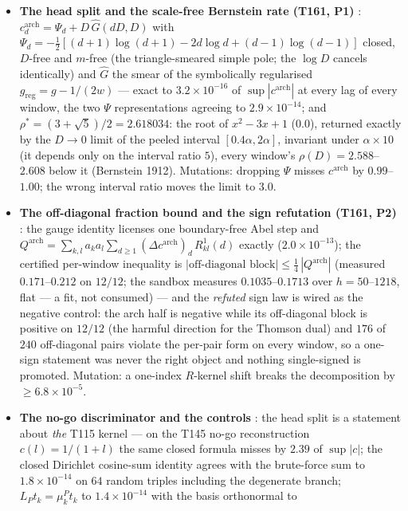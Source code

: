 \documentclass[11pt,a4paper]{article}
\begin{document}
\begin{itemize}[leftmargin=1.5em]
\emph{uniform} fake measure misses by $0.23$--$0.51\ge1.5\times$ the cap --- the agreement
is a property of the von-Mangoldt measure, not of any measure with the same mass.
\item \textbf{The head split and the scale-free Bernstein rate (T161, P1)} \mE:
$c^{\mathrm{arch}}_d=\Psi_d+D\,\widehat G(dD,D)$ with
$\Psi_d=-\tfrac12[(d{+}1)\log(d{+}1)-2d\log d+(d{-}1)\log(d{-}1)]$ closed, $D$-free and
$m$-free (the triangle-smeared simple pole; the $\log D$ cancels identically) and
$\widehat G$ the smear of the symbolically regularised $g_{\mathrm{reg}}=g-1/(2w)$ ---
exact to $3.2\times10^{-16}$ of $\sup|c^{\mathrm{arch}}|$ at every lag of every window, the
two $\Psi$ representations agreeing to $2.9\times10^{-14}$; and
$\rho^*=(3+\sqrt5)/2=2.618034$: the root of $x^2-3x+1$ ($0.0$), returned exactly by the
$D\to0$ limit of the peeled interval $[0.4\alpha,2\alpha]$, invariant under $\alpha\times10$
(it depends only on the interval ratio $5$), every window's $\rho(D)=2.588$--$2.608$ below
it (Bernstein 1912). Mutations: dropping $\Psi$ misses $c^{\mathrm{arch}}$ by
$0.99$--$1.00$; the wrong interval ratio moves the limit to $3.0$.
\item \textbf{The off-diagonal fraction bound and the sign refutation (T161, P2)} \mE: the
gauge identity licenses one boundary-free Abel step and
$Q^{\mathrm{arch}}=\sum_{k,l}a_ka_l\sum_{d\ge1}(\Delta c^{\mathrm{arch}})_d\,R^1_{kl}(d)$
exactly ($2.0\times10^{-13}$); the certified per-window inequality is
$|\text{off-diagonal block}|\le\tfrac14\,|Q^{\mathrm{arch}}|$ (measured $0.171$--$0.212$ on
$12/12$; the sandbox measures $0.1035$--$0.1713$ over $h=50$--$1218$, flat --- a fit, not
consumed) --- and the \emph{refuted} sign law is wired as the negative control: the arch
half is negative while its off-diagonal block is positive on $12/12$ (the harmful direction
for the Thomson dual) and $176$ of $240$ off-diagonal pairs violate the per-pair form on
every window, so a one-sign statement was never the right object and nothing single-signed
is promoted. Mutation: a one-index $R$-kernel shift breaks the decomposition by
$\ge6.8\times10^{-5}$.
\item \textbf{The no-go discriminator and the controls} \mE: the head split is a statement
about \emph{the} T115 kernel --- on the T145 no-go reconstruction $c(l)=1/(1+l)$ the same
closed formula misses by $2.39$ of $\sup|c|$; the closed Dirichlet cosine-sum identity
agrees with the brute-force sum to $1.8\times10^{-14}$ on $64$ random triples including the
degenerate branch; $L_Pt_k=\mu^P_kt_k$ to $1.4\times10^{-14}$ with the basis orthonormal to

\end{itemize}
\end{document}
